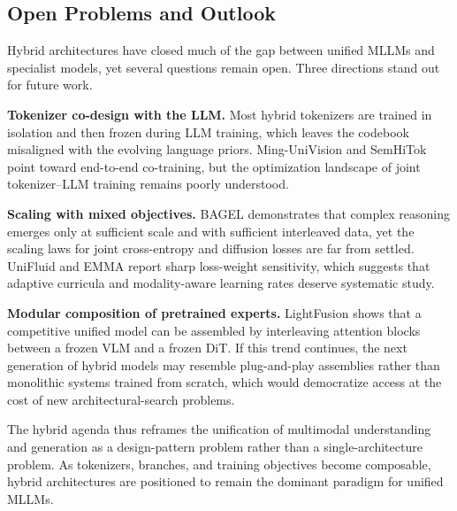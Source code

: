\subsection{Open Problems and Outlook}
\label{subsec:hybrid-outlook}

Hybrid architectures have closed much of the gap between unified MLLMs and specialist models, yet several questions remain open. Three directions stand out for future work.

\textbf{Tokenizer co-design with the LLM.} Most hybrid tokenizers are trained in isolation and then frozen during LLM training, which leaves the codebook misaligned with the evolving language priors. Ming-UniVision and SemHiTok point toward end-to-end co-training, but the optimization landscape of joint tokenizer--LLM training remains poorly understood.

\textbf{Scaling with mixed objectives.} BAGEL demonstrates that complex reasoning emerges only at sufficient scale and with sufficient interleaved data, yet the scaling laws for joint cross-entropy and diffusion losses are far from settled. UniFluid and EMMA report sharp loss-weight sensitivity, which suggests that adaptive curricula and modality-aware learning rates deserve systematic study.

\textbf{Modular composition of pretrained experts.} LightFusion shows that a competitive unified model can be assembled by interleaving attention blocks between a frozen VLM and a frozen DiT. If this trend continues, the next generation of hybrid models may resemble plug-and-play assemblies rather than monolithic systems trained from scratch, which would democratize access at the cost of new architectural-search problems.

The hybrid agenda thus reframes the unification of multimodal understanding and generation as a design-pattern problem rather than a single-architecture problem. As tokenizers, branches, and training objectives become composable, hybrid architectures are positioned to remain the dominant paradigm for unified MLLMs.

